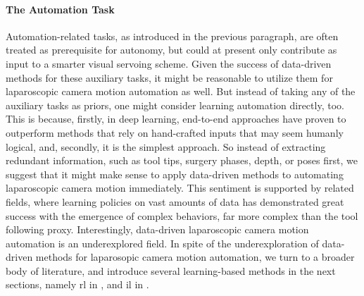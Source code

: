 \paragraph{The Automation Task} Automation-related tasks, as introduced in the previous paragraph, are often treated as prerequisite for autonomy, but could at present only contribute as input to a smarter visual servoing scheme. Given the success of data-driven methods for these auxiliary tasks, it might be reasonable to utilize them for laparoscopic camera motion automation as well. But instead of taking any of the auxiliary tasks as priors, one might consider learning automation directly, too. This is because, firstly, in deep learning, end-to-end approaches have proven to outperform methods that rely on hand-crafted inputs that may seem humanly logical, and, secondly, it is the simplest approach. So instead of extracting redundant information, such as tool tips, surgery phases, depth, or poses first, we suggest that it might make sense to apply data-driven methods to automating laparoscopic camera motion immediately. This sentiment is supported by related fields, where learning policies on vast amounts of data has demonstrated great success with the emergence of complex behaviors, far more complex than the tool following proxy. Interestingly, data-driven laparoscopic camera motion automation is an underexplored field. In spite of the underexploration of data-driven methods for laparosopic camera motion automation, we turn to a broader body of literature, and introduce several learning-based methods in the next sections, namely \gls{rl} in , and \gls{il} in .






